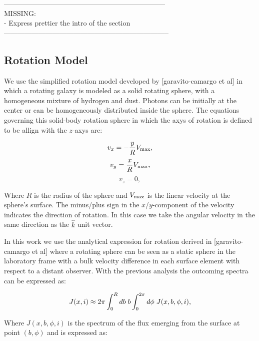 \documentclass{latex/emulateapj}
\newcommand{\hs}{{\hspace{1mm}}}
\begin{document}
---------------------------------------------------------------------\\
MISSING: \\
- Express prettier the intro of the section\\
-----------------------------------------------------------------------\\

\subsection{Rotation Model}

We use the simplified rotation model developed by [garavito-camargo et al]
in which a rotating galaxy is modeled as a solid rotating sphere, with a homogeneous mixture
of hydrogen and dust. Photons can be initially at the center or can be
homogeneously distributed inside the sphere. The equations governing this
 solid-body rotation sphere in which the axys of rotation is defined to be allign
 with the $z$-axys are:


\begin{equation}
    v_{x}=-\frac{y}{R}V_{\rm max}, \label{subeq1}
\end{equation}
\begin{equation}
    v_{y}=\frac{x}{R}V_{\rm max}, \label{subeq2}
\end{equation}
\begin{equation}
    v_{z}=0, \label{subeq3}
\end{equation}
%

Where $R$ is the radius of the sphere and $V_{\rm max}$ is the linear
velocity at the sphere's surface. The minus/plus sign in the
$x$/$y$-component of the velocity indicates the direction of
rotation. In this case we take the angular velocity in the same
direction as the $\hat{k}$ unit vector.

In this work we use the analytical expression for rotation derived in [garavito-camargo et al]
where a rotating sphere can be seen as a static sphere in the laboratory
frame with a bulk velocity difference in each surface element with respect
to a distant observer. With the previous analysis the outcoming spectra can be
expressed as:

\begin{equation}
J(x,i) \approx 2\pi \int_0^Rdb \hs b
\int_0^{2\pi}d\phi \hs J(x,b,\phi,i),
\end{equation}

Where $J(x, b, \phi, i)$ is the spectrum of the flux emerging from the
surface at point $(b, \phi)$ and is expressed as:
\end{document}
